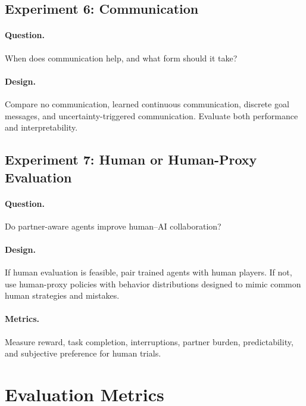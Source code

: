 \documentclass[letterpaper]{article} %
\begin{document}
\subsection{Experiment 6: Communication}

\paragraph{Question.}
When does communication help, and what form should it take?

\paragraph{Design.}
Compare no communication, learned continuous communication, discrete goal messages, and uncertainty-triggered communication. Evaluate both performance and interpretability.

\subsection{Experiment 7: Human or Human-Proxy Evaluation}

\paragraph{Question.}
Do partner-aware agents improve human--AI collaboration?

\paragraph{Design.}
If human evaluation is feasible, pair trained agents with human players. If not, use human-proxy policies with behavior distributions designed to mimic common human strategies and mistakes.

\paragraph{Metrics.}
Measure reward, task completion, interruptions, partner burden, predictability, and subjective preference for human trials.

\section{Evaluation Metrics}
\end{document}

